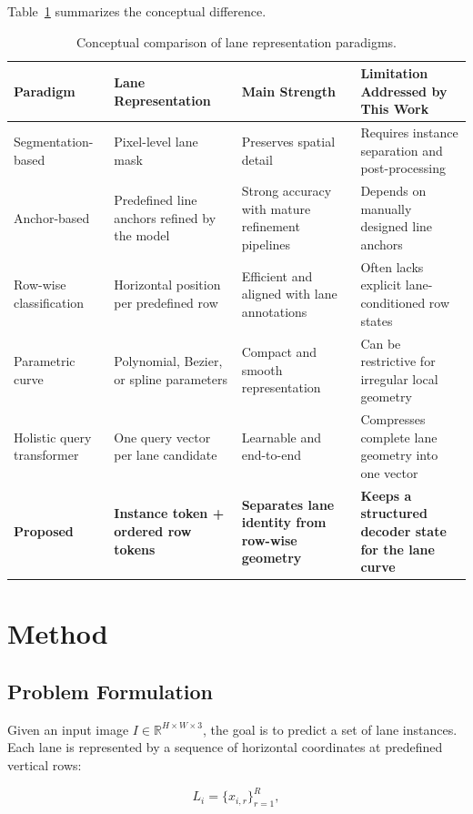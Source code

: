 \documentclass[conference]{IEEEtran}
\begin{document}
Table~\ref{tab:paradigm} summarizes the conceptual difference.

\begin{table}[t]
\centering
\caption{Conceptual comparison of lane representation paradigms.}
\label{tab:paradigm}
\begin{tabularx}{\linewidth}{lXXX}
\toprule
Paradigm & Lane Representation & Main Strength & Limitation Addressed by This Work \\
\midrule
Segmentation-based & Pixel-level lane mask & Preserves spatial detail & Requires instance separation and post-processing \\
Anchor-based & Predefined line anchors refined by the model & Strong accuracy with mature refinement pipelines & Depends on manually designed line anchors \\
Row-wise classification & Horizontal position per predefined row & Efficient and aligned with lane annotations & Often lacks explicit lane-conditioned row states \\
Parametric curve & Polynomial, Bezier, or spline parameters & Compact and smooth representation & Can be restrictive for irregular local geometry \\
Holistic query transformer & One query vector per lane candidate & Learnable and end-to-end & Compresses complete lane geometry into one vector \\
\textbf{Proposed} & \textbf{Instance token + ordered row tokens} & \textbf{Separates lane identity from row-wise geometry} & \textbf{Keeps a structured decoder state for the lane curve} \\
\bottomrule
\end{tabularx}
\end{table}

\section{Method}

\subsection{Problem Formulation}

Given an input image $I \in \mathbb{R}^{H \times W \times 3}$, the goal is to predict a set of lane instances. Each lane is represented by a sequence of horizontal coordinates at predefined vertical rows:

\begin{equation}
    L_i = \{x_{i,r}\}_{r=1}^{R},
\end{equation}
\end{document}
